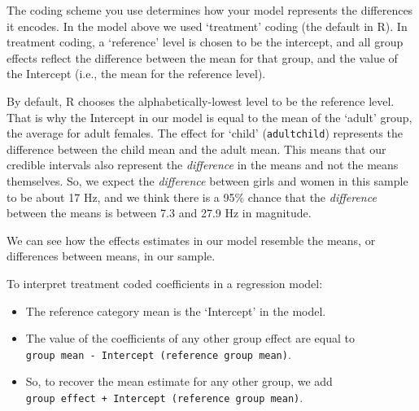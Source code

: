 \documentclass[
]{book}
\newenvironment{Shaded}{\begin{snugshade}}{\end{snugshade}}
\newcommand{\CommentTok}[1]{\textcolor[rgb]{0.56,0.35,0.01}{\textit{#1}}}
\newcommand{\DocumentationTok}[1]{\textcolor[rgb]{0.56,0.35,0.01}{\textbf{\textit{#1}}}}
\newcommand{\FunctionTok}[1]{\textcolor[rgb]{0.00,0.00,0.00}{#1}}
\newcommand{\NormalTok}[1]{#1}
\newcommand{\SpecialCharTok}[1]{\textcolor[rgb]{0.00,0.00,0.00}{#1}}
\begin{document}
The coding scheme you use determines how your model represents the differences it encodes. In the model above we used `treatment' coding (the default in R). In treatment coding, a `reference' level is chosen to be the intercept, and all group effects reflect the difference between the mean for that group, and the value of the Intercept (i.e., the mean for the reference level).

By default, R chooses the alphabetically-lowest level to be the reference level. That is why the Intercept in our model is equal to the mean of the `adult' group, the average for adult females. The effect for `child' (\texttt{adultchild}) represents the difference between the child mean and the adult mean. This means that our credible intervals also represent the \emph{difference} in the means and not the means themselves. So, we expect the \emph{difference} between girls and women in this sample to be about 17 Hz, and we think there is a 95\% chance that the \emph{difference} between the means is between 7.3 and 27.9 Hz in magnitude.

We can see how the effects estimates in our model resemble the means, or differences between means, in our sample.

\begin{Shaded}
\end{Shaded}

To interpret treatment coded coefficients in a regression model:

\begin{itemize}
\item
  The reference category mean is the `Intercept' in the model.
\item
  The value of the coefficients of any other group effect are equal to \texttt{group\ mean\ -\ Intercept\ (reference\ group\ mean)}.
\item
  So, to recover the mean estimate for any other group, we add \texttt{group\ effect\ +\ Intercept\ (reference\ group\ mean)}.
\end{itemize}
\end{document}
